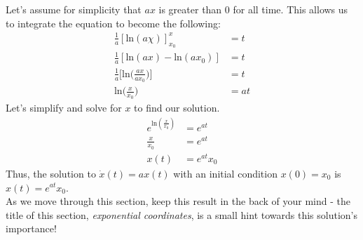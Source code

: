 \documentclass[oneside]{book}
\begin{document}
Let's assume for simplicity that $ax$ is greater than $0$ for all time. This allows us to integrate the equation to become the following:
\begin{align}
    \frac{1}{a}[\mathrm{ln}(a\chi)]_{x_0}^x &= t\\
    \frac{1}{a}[\mathrm{ln}(ax) - \mathrm{ln}(ax_0)] &= t\\
    \frac{1}{a}\Big[\mathrm{ln}\Big(\frac{ax}{ax_0}\Big)\Big] &= t\\
    \mathrm{ln}\Big(\frac{x}{x_0}\Big) &= at
\end{align}
Let's simplify and solve for $x$ to find our solution.
\begin{align}
    e^{\mathrm{ln}(\frac{x}{x_0})} &= e^{at}\\
    \frac{x}{x_0} &= e^{at}\\
    x(t) &= e^{at}x_0
\end{align}
Thus, the solution to $\dot{x}(t) = ax(t)$ with an initial condition $x(0) = x_0$ is $x(t) = e^{at}x_0$.\\
As we move through this section, keep this result in the back of your mind - the title of this section, \textit{exponential coordinates}, is a small hint towards this solution's importance!
\end{document}
